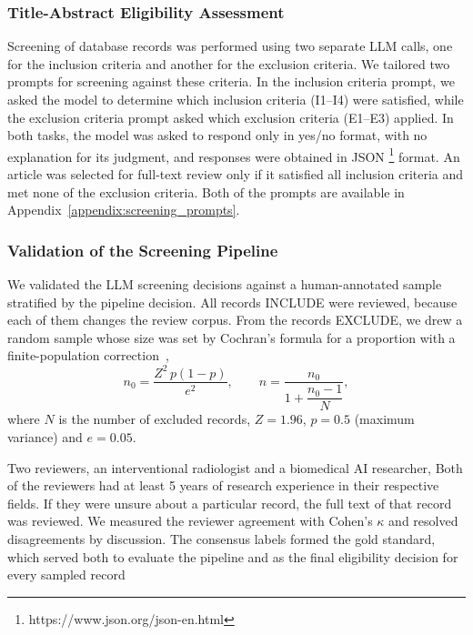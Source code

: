 \subsubsection{Title-Abstract Eligibility Assessment}
\label{sec:title-abstract-sceening}

Screening of database records was performed using two separate LLM calls, one for the inclusion criteria and another for the exclusion criteria. We tailored two prompts for screening against these criteria. In the inclusion criteria prompt, we asked the model to determine which inclusion criteria (I1--I4) were satisfied, while the exclusion criteria prompt asked which exclusion criteria (E1--E3) applied. In both tasks, the model was asked to respond only in yes/no format, with no explanation for its judgment, and responses were obtained in JSON \footnote{https://www.json.org/json-en.html} format. An article was selected for full-text review only if it satisfied all inclusion criteria and met none of the exclusion criteria. Both of the prompts are available in Appendix~\ref{appendix:screening_prompts}.



\subsubsection{Validation of the Screening Pipeline}
\label{sec:validation}

We validated the LLM screening decisions against a human-annotated sample stratified by the pipeline decision. All records  INCLUDE were reviewed, because each of them changes the review corpus. From the records  EXCLUDE, we drew a random sample whose size was set by Cochran's formula for a proportion with a finite-population correction~\cite{cochran1977sampling},
\begin{equation}
n_0 = \frac{Z^2\,p(1-p)}{e^2}, \qquad n = \frac{n_0}{1 + \dfrac{n_0-1}{N}},
\end{equation}
where $N$ is the number of excluded records, $Z=1.96$, $p=0.5$ (maximum variance) and $e=0.05$.

Two reviewers, an interventional radiologist and a biomedical AI researcher,  Both of the reviewers had at least 5 years of research experience in their respective fields. If they were unsure about a particular record, the full text of that record was reviewed. We measured the reviewer agreement with Cohen's $\kappa$ \cite{kvaalseth1989note} and resolved disagreements by discussion. The consensus labels formed the gold standard, which served both to evaluate the pipeline and as the final eligibility decision for every sampled record



